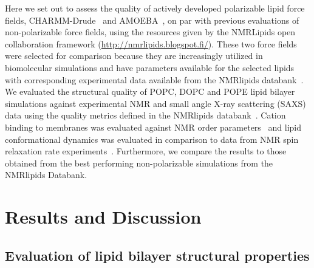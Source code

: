 \documentclass[journal=jacsat,manuscript=article,layout=singlecolumn]{achemso}
\begin{document}
Here we set out to assess the quality of actively developed polarizable lipid force fields, CHARMM-Drude~\cite{li2017drude,yu2023drude} and  AMOEBA~\cite{chu2018anionicpolarizable,chu2018polarizable}, on par with previous evaluations of non-polarizable force fields, using the resources given by the NMRLipids open collaboration framework (\url{http://nmrlipids.blogspot.fi/}). These two force fields were selected for comparison because they are increasingly utilized in biomolecular simulations and have parameters available for the selected lipids with corresponding experimental data available from the NMRlipids databank~\cite{Databank}. We evaluated the structural quality of POPC, DOPC and POPE lipid bilayer simulations against experimental NMR and small angle X-ray scattering (SAXS) data using the quality metrics defined in the NMRlipids databank~\cite{Databank}. Cation binding to membranes was evaluated against NMR order parameters~\cite{Catte2016} and lipid conformational dynamics was evaluated in comparison to data from NMR spin relaxation rate experiments~\cite{ferreira15,Antila2021}. 
Furthermore, we compare the results to those obtained from the best performing non-polarizable simulations from the NMRlipids Databank\cite{Databank}. 






 



 
\section{Results and Discussion}

\subsection{Evaluation of lipid bilayer structural properties}
\end{document}
